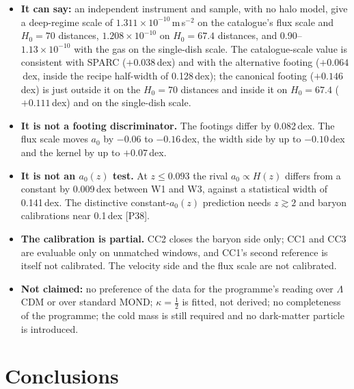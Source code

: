 \documentclass[10pt]{article}
\begin{document}
\begin{itemize}
\item \textbf{It can say:} an independent instrument and sample, with no halo model, give a deep-regime scale of $1.311\times10^{-10}$\,m\,s$^{-2}$ on the catalogue's flux scale and $H_0=70$ distances, $1.208\times10^{-10}$ on $H_0=67.4$ distances, and 0.90--$1.13\times10^{-10}$ with the gas on the single-dish scale. The catalogue-scale value is consistent with SPARC ($+0.038$\,dex) and with the alternative footing ($+0.064$\,dex, inside the recipe half-width of 0.128\,dex); the canonical footing ($+0.146$\,dex) is just outside it on the $H_0=70$ distances and inside it on $H_0=67.4$ ($+0.111$\,dex) and on the single-dish scale.
\item \textbf{It is not a footing discriminator.} The footings differ by 0.082\,dex. The flux scale moves $a_0$ by $-0.06$ to $-0.16$\,dex, the width side by up to $-0.10$\,dex and the kernel by up to $+0.07$\,dex.
\item \textbf{It is not an $a_0(z)$ test.} At $z\le0.093$ the rival $a_0\propto H(z)$ differs from a constant by 0.009\,dex between W1 and W3, against a statistical width of 0.141\,dex. The distinctive constant-$a_0(z)$ prediction needs $z\gtrsim2$ and baryon calibrations near 0.1\,dex [P38].
\item \textbf{The calibration is partial.} CC2 closes the baryon side only; CC1 and CC3 are evaluable only on unmatched windows, and CC1's second reference is itself not calibrated. The velocity side and the flux scale are not calibrated.
\item \textbf{Not claimed:} no preference of the data for the programme's reading over $\Lambda$CDM or over standard MOND; $\kappa=\tfrac12$ is fitted, not derived; no completeness of the programme; the cold mass is still required and no dark-matter particle is introduced.
\end{itemize}

\section{Conclusions}\label{sec:concl}
\end{document}
